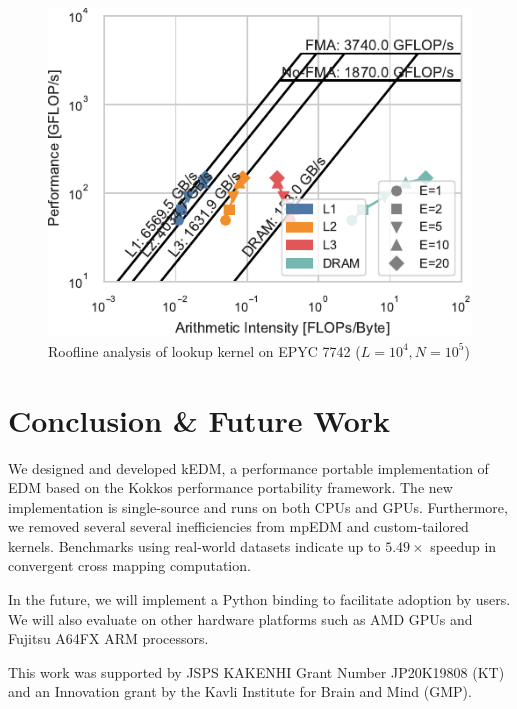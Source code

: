 \documentclass[sigconf]{acmart}
\begin{document}
\begin{figure}
    \centering
    \includegraphics{figs/roofline_lookup_wo_rho_epyc}
    \caption{Roofline analysis of lookup kernel on EPYC 7742 ($L=10^4, N=10^5$)}%
    \label{fig:roofline-lookup-eypc}
\end{figure}

\section{Conclusion \& Future Work}\label{sec:conclusion}

We designed and developed kEDM, a performance portable implementation of EDM
based on the Kokkos performance portability framework. The new implementation
is single-source and runs on both CPUs and GPUs. Furthermore, we removed several
several inefficiencies from mpEDM and custom-tailored kernels. Benchmarks using real-world datasets indicate up to $5.49\times$
speedup in convergent cross mapping computation.

In the future, we will implement a Python binding to facilitate adoption by
users. We will also evaluate on other hardware platforms such as AMD GPUs and
Fujitsu A64FX ARM processors.

\begin{acks}
This work was supported by JSPS KAKENHI Grant Number JP20K19808 (KT) and an
Innovation grant by the Kavli Institute for Brain and Mind (GMP).
\end{acks}



\end{document}
